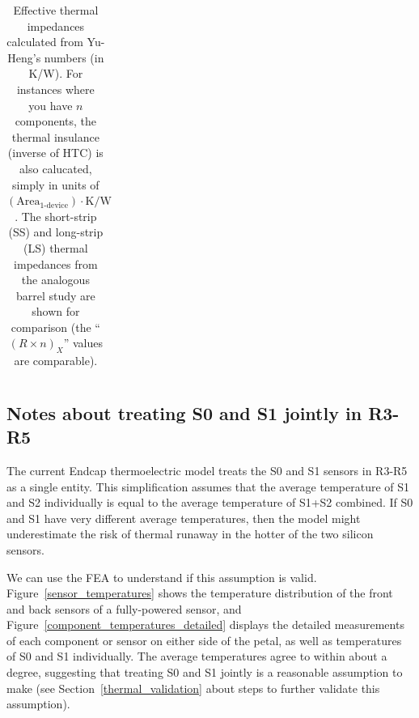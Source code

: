 \begin{table}[h]
\begin{center}
{\begin{tabular}{|l|cc|c|c|c|c|c|c|}
\hline \end{tabular}
} %
\end{center}
\caption{Effective thermal impedances calculated from Yu-Heng's numbers (in K/W).
For instances where you have $n$ components, the thermal insulance (inverse of HTC) is also calucated, simply
in units of {${(\text{Area}_\text{1-device})\cdot\text{K/W}}$}.
The short-strip (SS) and long-strip (LS) thermal impedances from the analogous barrel study are shown
for comparison (the ``$(R\times n)_X$'' values are comparable).
}
\label{tab:thermal_impedances}
\end{table}
\let\arraystretch\arraystretcha

\subsection{Notes about treating S0 and S1 jointly in R3-R5}

The current Endcap thermoelectric model treats the S0 and S1 sensors in R3-R5 as a single entity.
This simplification assumes that the average temperature of S1 and S2 individually is equal to the
average temperature of S1+S2 combined. If S0 and S1 have very different average temperatures, then
the model might underestimate the risk of thermal runaway in the hotter of the two silicon sensors.

We can use the FEA to understand if this assumption is valid.
Figure~\ref{sensor_temperatures} shows the temperature distribution of the front and back sensors of a
fully-powered sensor, and Figure~\ref{component_temperatures_detailed} displays the detailed
measurements of each component or sensor on either side of the petal, as well as temperatures of S0 and
S1 individually. The average temperatures agree to within about a degree, suggesting that treating
S0 and S1 jointly is a reasonable assumption to make (see Section~\ref{thermal_validation} about steps
to further validate this assumption).

